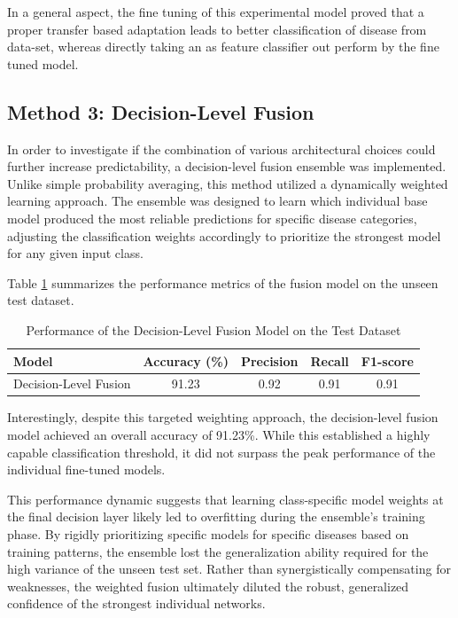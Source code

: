 In a general aspect, the fine tuning of this experimental model proved that a proper transfer based adaptation leads to better classification of disease from data-set, whereas directly taking an as feature classifier out perform by the fine tuned model.


\subsection{Method 3: Decision-Level Fusion}

In order to investigate if the combination of various architectural choices could further increase predictability, a decision-level fusion ensemble was implemented. Unlike simple probability averaging, this method utilized a dynamically weighted learning approach. The ensemble was designed to learn which individual base model produced the most reliable predictions for specific disease categories, adjusting the classification weights accordingly to prioritize the strongest model for any given input class.

Table \ref{tab:fusion_results} summarizes the performance metrics of the fusion model on the unseen test dataset.

\begin{table}[H]
\centering
\label{tab:fusion_results}
\renewcommand{\arraystretch}{1.2}
\begin{tabular}{lcccc}
\hline
\textbf{Model} & \textbf{Accuracy (\%)} & \textbf{Precision} & \textbf{Recall} & \textbf{F1-score} \\
\hline
Decision-Level Fusion & 91.23 & 0.92 & 0.91 & 0.91 \\
\hline
\end{tabular}
\caption{Performance of the Decision-Level Fusion Model on the Test Dataset}
\end{table}

Interestingly, despite this targeted weighting approach, the decision-level fusion model achieved an overall accuracy of 91.23\%. While this established a highly capable classification threshold, it did not surpass the peak performance of the individual fine-tuned models. 

This performance dynamic suggests that learning class-specific model weights at the final decision layer likely led to overfitting during the ensemble's training phase. By rigidly prioritizing specific models for specific diseases based on training patterns, the ensemble lost the generalization ability required for the high variance of the unseen test set. Rather than synergistically compensating for weaknesses, the weighted fusion ultimately diluted the robust, generalized confidence of the strongest individual networks.

